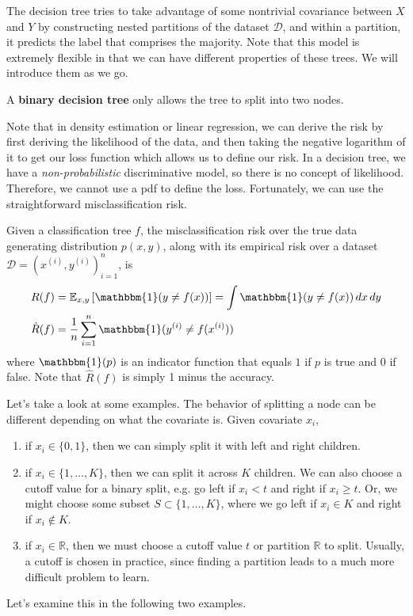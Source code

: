   The decision tree tries to take advantage of some nontrivial covariance between $X$ and $Y$ by constructing nested partitions of the dataset $\mathcal{D}$, and within a partition, it predicts the label that comprises the majority. Note that this model is extremely flexible in that we can have different properties of these trees. We will introduce them as we go. 

  \begin{definition}
    \label{def:binary-decision-tree}
    A \textbf{binary decision tree} only allows the tree to split into two nodes. 
  \end{definition} 

  Note that in density estimation or linear regression, we can derive the risk by first deriving the likelihood of the data, and then taking the negative logarithm of it to get our loss function which allows us to define our risk. In a decision tree, we have a \textit{non-probabilistic} discriminative model, so there is no concept of likelihood. Therefore, we cannot use a pdf to define the loss. Fortunately, we can use the straightforward misclassification risk. 

  \begin{theorem}
    \label{thm:expected-and-empirical-risk-of-decision-trees}
    Given a classification tree $f$, the misclassification risk over the true data generating distribution $p(x, y)$, along with its empirical risk over a dataset $\mathcal{D} = (x^{(i)}, y^{(i)})_{i=1}^n$, is 
    \begin{align}
      R(f) & = \mathbb{E}_{x, y} \left[ \mathbbm{1} (y \neq f(x))\right] = \int \mathbbm{1} (y \neq f(x)) \, dx \,dy \\ 
      \hat{R}(f) & = \frac{1}{n} \sum_{i=1}^n \mathbbm{1} (y^{(i)} \neq f(x^{(i)}))
    \end{align}
    where $\mathbbm{1}(p)$ is an indicator function that equals $1$ if $p$ is true and $0$ if false. Note that $\hat{R}(f)$ is simply 1 minus the accuracy. 
  \end{theorem} 

  Let's take a look at some examples. The behavior of splitting a node can be different depending on what the covariate is. Given covariate $x_i$, 
  \begin{enumerate}
    \item if $x_i \in \{0, 1\}$, then we can simply split it with left and right children. 
    \item if $x_i \in \{1, \ldots, K\}$, then we can split it across $K$ children. We can also choose a cutoff value for a binary split, e.g. go left if $x_i < t$ and right if $x_i \geq t$. Or, we might choose some subset $S \subset \{1, \ldots, K\}$, where we go left if $x_i \in K$ and right if $x_i \not\in K$. 
    \item if $x_i \in \mathbb{R}$, then we must choose a cutoff value $t$ or partition $\mathbb{R}$ to split. Usually, a cutoff is chosen in practice, since finding a partition leads to a much more difficult problem to learn. 
  \end{enumerate}
  Let's examine this in the following two examples. 

